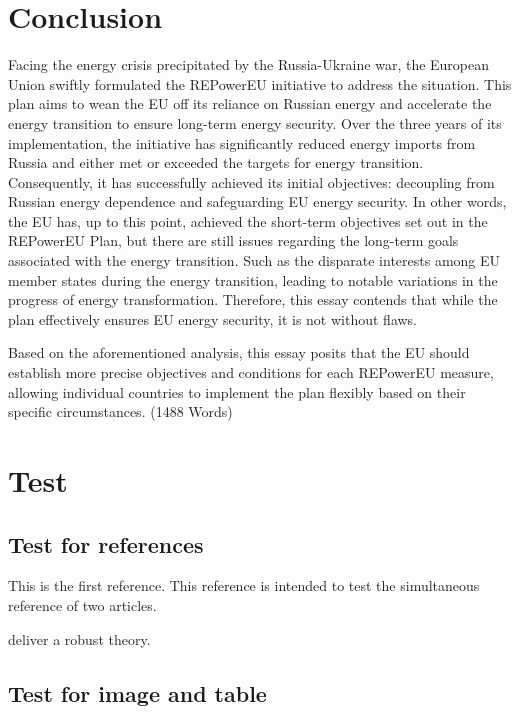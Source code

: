 \documentclass[12pt,a4paper]{article}
\begin{document}
\section{Conclusion}
Facing the energy crisis precipitated by the Russia-Ukraine war, the European Union swiftly formulated the REPowerEU initiative to address the situation. This plan aims to wean the EU off its reliance 
on Russian energy and accelerate the energy transition to ensure long-term energy security. Over the three years of its implementation, the initiative has significantly reduced energy imports from 
Russia and either met or exceeded the targets for energy transition. Consequently, it has successfully achieved its initial objectives: decoupling from Russian energy dependence and safeguarding EU 
energy security. In other words, the EU has, up to this point, achieved the short-term objectives set out in the REPowerEU Plan, but there are still issues regarding the long-term goals associated 
with the energy transition. Such as the disparate interests among EU member states during the energy transition, leading to notable variations in the progress of energy transformation. Therefore, 
this essay contends that while the plan effectively ensures EU energy security, it is not without flaws.

Based on the aforementioned analysis, this essay posits that the EU should establish more precise objectives and conditions for each REPowerEU measure, allowing individual countries to implement the 
plan flexibly based on their specific circumstances. (1488 Words)

\section{Test}
\subsection{Test for references}
This is the first reference\parencite{andrikogiannopoulou_reassessing_2019}. This reference is intended to test the simultaneous reference of two articles\parencite{barras_false_nodate,lee_boosting_2024}.

\textcite{wang_robust_2024} deliver a robust theory.

\subsection{Test for image and table}
\end{document}
